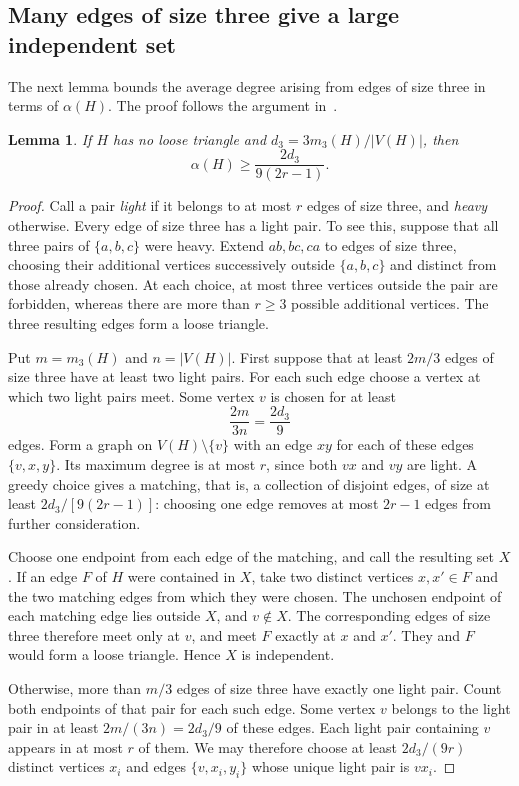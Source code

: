 \documentclass[11pt]{article}
\numberwithin{equation}{section}
\newtheorem{lemma}[theorem]{Lemma}
\theoremstyle{remark}
\begin{document}
\subsection{Many edges of size three give a large independent set}
The next lemma bounds the average degree arising from edges of size three in terms of $\alpha(H)$. The proof follows the argument in~\cite[Section~3.2]{KMV}.

\begin{lemma}\label{lem:density}
If $H$ has no loose triangle and $d_3=3m_3(H)/|V(H)|$, then
\[
 \alpha(H)\ge\frac{2d_3}{9(2r-1)}.
\]
\end{lemma}
\begin{proof}
Call a pair \emph{light} if it belongs to at most $r$ edges of size three, and \emph{heavy} otherwise. Every edge of size three has a light pair. To see this, suppose that all three pairs of $\{a,b,c\}$ were heavy. Extend $ab,bc,ca$ to edges of size three, choosing their additional vertices successively outside $\{a,b,c\}$ and distinct from those already chosen. At each choice, at most three vertices outside the pair are forbidden, whereas there are more than $r\ge3$ possible additional vertices. The three resulting edges form a loose triangle.

Put $m=m_3(H)$ and $n=|V(H)|$. First suppose that at least $2m/3$ edges of size three have at least two light pairs. For each such edge choose a vertex at which two light pairs meet. Some vertex $v$ is chosen for at least
\[
 \frac{2m}{3n}=\frac{2d_3}{9}
\]
edges. Form a graph on $V(H)\setminus\{v\}$ with an edge $xy$ for each of these edges $\{v,x,y\}$. Its maximum degree is at most $r$, since both $vx$ and $vy$ are light. A greedy choice gives a matching, that is, a collection of disjoint edges, of size at least $2d_3/[9(2r-1)]$: choosing one edge removes at most $2r-1$ edges from further consideration.

Choose one endpoint from each edge of the matching, and call the resulting set $X$. If an edge $F$ of $H$ were contained in $X$, take two distinct vertices $x,x'\in F$ and the two matching edges from which they were chosen. The unchosen endpoint of each matching edge lies outside $X$, and $v\notin X$. The corresponding edges of size three therefore meet only at $v$, and meet $F$ exactly at $x$ and $x'$. They and $F$ would form a loose triangle. Hence $X$ is independent.

Otherwise, more than $m/3$ edges of size three have exactly one light pair. Count both endpoints of that pair for each such edge. Some vertex $v$ belongs to the light pair in at least $2m/(3n)=2d_3/9$ of these edges. Each light pair containing $v$ appears in at most $r$ of them. We may therefore choose at least $2d_3/(9r)$ distinct vertices $x_i$ and edges $\{v,x_i,y_i\}$ whose unique light pair is $vx_i$.


\end{proof}
\end{document}
